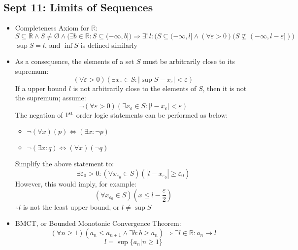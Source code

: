 \documentclass[10pt, oneside]{article}
\let\leq\leqslant
\let\geq\geqslant
\newcommand{\R}{\mathbb{R}}
\let\foo\O
\renewcommand{\O}{\text{\foo}}
\begin{document}
\subsection{Sept 11: Limits of Sequences}
\begin{itemize}
    \item Completeness Axiom for $\R$:
        \[S \subseteq \R \land S \neq \O \land \Big( \exists b \in \R : S \subseteq (-\infty,b] \Big) \Rightarrow \exists! \, l : \Big( S\subseteq (-\infty,l] \land (\forall \varepsilon > 0) (S \not\subseteq (-\infty,l-\varepsilon]) \Big)\]
        $\sup S = l$, and $\inf S$ is defined similarly
    \item As a consequence, the elements of a set $S$ must be arbitrarily close to its supremum:
        \[(\forall \varepsilon > 0)(\exists x_\varepsilon \in S : |\sup S - x_\varepsilon | < \varepsilon)\]
    If a upper bound $l$ is not arbitrarily close to the elements of $S$, then it is not the supremum; assume:
        \[\lnot(\forall \varepsilon > 0)(\exists x_\varepsilon \in S : | l - x_\varepsilon | < \varepsilon)\]
    The negation of $1^{\rm st}$ order logic statements can be performed as below:
    \begin{itemize}
        \item $\lnot(\forall x)(p) \Leftrightarrow (\exists x:\lnot p)$
        \item $\lnot(\exists x:q) \Leftrightarrow (\forall x)(\lnot q)$
    \end{itemize}
    Simplify the above statement to:
        \[\exists \varepsilon_0 > 0 : (\forall x_{\varepsilon_0} \in S) (| l - x_{\varepsilon_0} | \geq \varepsilon_0)\]
    However, this would imply, for example:
        \[(\forall x_{\varepsilon_0} \in S) \left( x \leq l - \frac{\varepsilon}{2} \right)\]
    $\therefore l$ is not the least upper bound, or $l \neq \sup S$
    \item BMCT, or Bounded Monotonic Convergence Theorem:
        \[(\forall n \geq 1)(a_n \leq a_{n+1} \land \exists b : b \geq a_n) \Rightarrow \exists l \in \R : a_n \rightarrow l\]
        \[l = \sup \{a_n|n \geq 1\} \]
\end{itemize}
\end{document}
